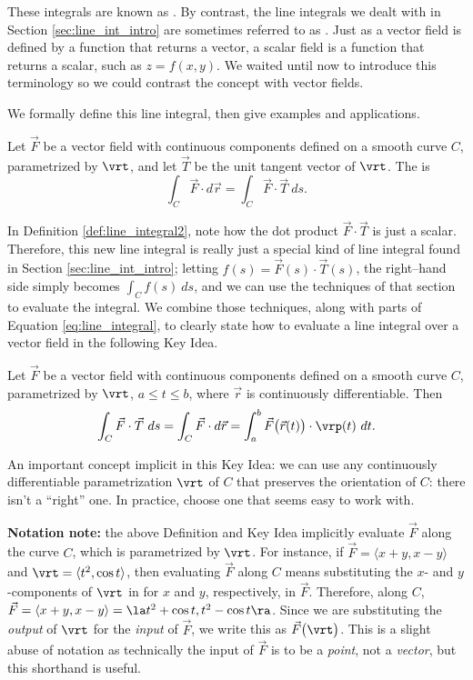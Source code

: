 These integrals are known as . By contrast, the line integrals we dealt with in Section \ref{sec:line_int_intro} are sometimes referred to as . Just as a vector field is defined by a function that returns a vector, a scalar field is a function that returns a scalar, such as $z = f(x,y)$. We waited until now to introduce this terminology so we could contrast the concept with vector fields. 

We formally define this line integral, then give examples and applications.

{Let $\vec F$ be a vector field with continuous components defined on a smooth curve $C$, parametrized by $\vrt$, and let $\vec T$ be the unit tangent vector of $\vrt$. The  is
$$\int_C \vec F\cdot d\vec r = \int_C \vec F\cdot\vec T\ ds.$$
}

In Definition \ref{def:line_integral2}, note how the dot product $\vec F \cdot \vec T$ is just a scalar. %
Therefore, this new line integral is really just a special kind of line integral found in Section \ref{sec:line_int_intro}; letting $f(s) = \vec F(s)\cdot \vec T(s)$, the right--hand side simply becomes $\int_C f(s)\ ds$, and we can use the techniques of that section to evaluate the integral. We combine those techniques, along with parts of Equation \eqref{eq:line_integral}, to clearly state how to evaluate a line integral over a vector field in the following Key Idea. 

{Let $\vec F$ be a vector field with continuous components defined on a smooth curve $C$, parametrized by $\vrt$, $a\leq t\leq b$, where $\vec r$ is continuously differentiable. Then
	$$\int_C\vec F\cdot\vec T\ ds = \int_C \vec F\cdot d\vec r =\int_a^b \vec F\big(\vec r(t)\big) \cdot \vrp(t)\ dt.$$
}

An important concept implicit in this Key Idea: we can use any continuously differentiable parametrization $\vrt$ of $C$ that preserves the orientation of $C$: there isn't a ``right'' one. In practice, choose one that seems easy to work with. 

\textbf{Notation note:} the above Definition and Key Idea implicitly evaluate $\vec F$ along the curve $C$, which is parametrized by $\vrt$. For instance, if $\vec F = \langle x+y, x-y\rangle$ and $\vrt = \langle t^2,\cos t\rangle$, then evaluating $\vec F$ along $C$ means substituting the $x$- and $y$-components of $\vrt$ in for $x$ and $y$, respectively, in $\vec F$. Therefore, along $C$, $\vec F = \langle x+y,x-y\rangle = \la t^2+\cos t, t^2-\cos t\ra$. Since we are substituting the \emph{output} of $\vrt$ for the \emph{input} of $\vec F$, we write this as $\vec F\big(\vrt\big)$. This is a slight abuse of notation as technically the input of $\vec F$ is to be a \emph{point}, not a \emph{vector}, but this shorthand is useful.

